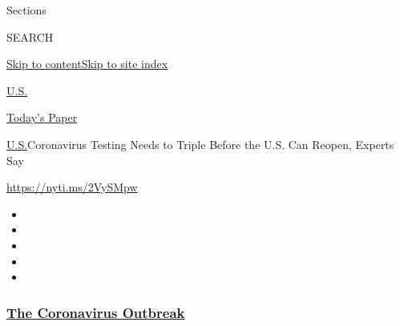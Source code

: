 Sections

SEARCH

\protect\hyperlink{site-content}{Skip to
content}\protect\hyperlink{site-index}{Skip to site index}

\href{https://www.nytimes3xbfgragh.onion/section/us}{U.S.}

\href{https://myaccount.nytimes3xbfgragh.onion/auth/login?response_type=cookie\&client_id=vi}{}

\href{https://www.nytimes3xbfgragh.onion/section/todayspaper}{Today's
Paper}

\href{/section/us}{U.S.}\textbar{}Coronavirus Testing Needs to Triple
Before the U.S. Can Reopen, Experts Say

\url{https://nyti.ms/2VySMpw}

\begin{itemize}
\item
\item
\item
\item
\item
\end{itemize}

\hypertarget{the-coronavirus-outbreak}{%
\subsubsection{\texorpdfstring{\href{https://www.nytimes3xbfgragh.onion/news-event/coronavirus?name=styln-coronavirus-national\&region=TOP_BANNER\&block=storyline_menu_recirc\&action=click\&pgtype=Interactive\&impression_id=eb4cea10-f1c1-11ea-a22b-e581da043942\&variant=undefined}{The
Coronavirus
Outbreak}}{The Coronavirus Outbreak}}\label{the-coronavirus-outbreak}}


